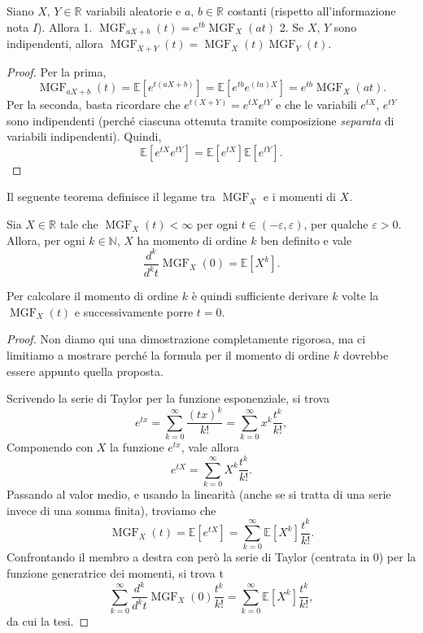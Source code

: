 \documentclass[
  italian,
  letterpaper,
]{book}
\newcommand{\sqa}[1]{\left[ #1 \right]}
\newcommand{\R}{\mathbb{R}}
\newcommand{\N}{\mathbb{N}}
\newcommand{\E}[1]{\mathbb{E}\sqa{#1}}
\theoremstyle{definition}
\theoremstyle{remark}
\begin{document}
Siano \(X\), \(Y \in \R\) variabili aleatorie e \(a\), \(b\in \R\)
costanti (rispetto all'informazione nota \(I\)). Allora 1.
\(\operatorname{MGF}_{aX+b}(t)= e^{tb} \operatorname{MGF}_{X}(at)\) 2.
Se \(X\), \(Y\) sono indipendenti, allora
\(\operatorname{MGF}_{X+Y}(t) = \operatorname{MGF}_{X}(t)\operatorname{MGF}_{Y}(t)\).

\begin{proof}
Per la prima,
\[ \operatorname{MGF}_{aX+b}(t)= \E{e^{t(aX+b)}} = \E{e^{tb} e^{(ta)X}} = e^{tb} \operatorname{MGF}_{X}(at).\]
Per la seconda, basta ricordare che \(e^{t(X+Y)} = e^{tX}e^{tY}\) e che
le variabili \(e^{tX}\), \(e^{tY}\) sono indipendenti (perché ciascuna
ottenuta tramite composizione \emph{separata} di variabili
indipendenti). Quindi, \[\E{e^{tX}e^{tY}} = \E{e^{tX}}\E{e^{tY}}.\]
\end{proof}

Il seguente teorema definisce il legame tra \(\operatorname{MGF}_X\) e i
momenti di \(X\).

Sia \(X \in \R\) tale che \(\operatorname{MGF}_X(t)<\infty\) per ogni
\(t \in (-\varepsilon, \varepsilon)\), per qualche \(\varepsilon>0\).
Allora, per ogni \(k \in \N\), \(X\) ha momento di ordine \(k\) ben
definito e vale
\[ \frac{d^k}{d^k t} \operatorname{MGF}_X(0) = \E{X^k}.\]

Per calcolare il momento di ordine \(k\) è quindi sufficiente derivare
\(k\) volte la \(\operatorname{MGF}_X(t)\) e successivamente porre
\(t=0\).

\begin{proof}
Non diamo qui una dimostrazione completamente rigorosa, ma ci limitiamo
a mostrare perché la formula per il momento di ordine \(k\) dovrebbe
essere appunto quella proposta.

Scrivendo la serie di Taylor per la funzione esponenziale, si trova
\[ e^{tx} = \sum_{k=0}^\infty \frac{(tx)^k}{k!} = \sum_{k=0}^\infty x^k \frac{t^k}{k!} ,\]
Componendo con \(X\) la funzione \(e^{tx}\), vale allora
\[ e^{tX} = \sum_{k=0}^\infty X^k \frac{t^k}{k!}.\] Passando al valor
medio, e usando la linearità (anche se si tratta di una serie invece di
una somma finita), troviamo che
\[ \operatorname{MGF}_X(t) = \E{e^{tX}}= \sum_{k=0}^\infty \E{X^k} \frac{t^k}{k!}.\]
Confrontando il membro a destra con però la serie di Taylor (centrata in
\(0\)) per la funzione generatrice dei momenti, si trova
t\[  \sum_{k=0}^\infty \frac{d^k}{d^k t} \operatorname{MGF}_X(0) \frac{t^k}{k!} =  \sum_{k=0}^\infty \E{X^k} \frac{t^k}{k!},\]
da cui la tesi.
\end{proof}
\end{document}
